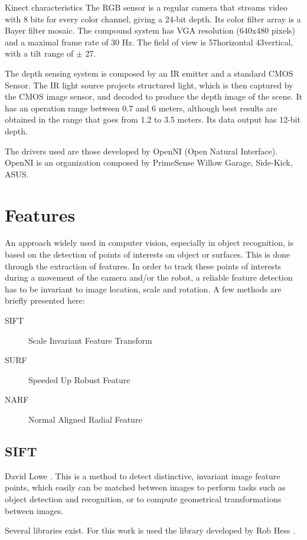 \documentclass[a4paper,11pt]{kth-mag}
\begin{document}
Kinect characteristics
The RGB sensor is a regular camera that streams video with 8 bits for every color channel, giving a 24-bit depth. Its color filter array is a Bayer filter mosaic. The compound system has VGA resolution (640x480 pixels) and a maximal frame rate of 30 Hz. The field of view is 57\textdegree horizontal 43\textdegree vertical, with a tilt range of $\pm$ 27\textdegree.

The depth sensing system is composed by an IR emitter and a standard CMOS Sensor. The IR light source projects structured light, which is then captured by the CMOS image sensor, and decoded to produce the depth image of the scene. It has an operation range between 0.7 and 6 meters, although best results are obtained in the range that goes from 1.2 to 3.5 meters. Its data output has 12-bit depth.

The drivers used are those developed by OpenNI (Open Natural Interface). OpenNI is an organization composed by PrimeSense Willow Garage, Side-Kick, ASUS.


\section{Features}

An approach widely used in computer vision, especially in object recognition, is based on the detection of points of interests on object or surfaces. This is done through the extraction of features. In order to track these points of interests during a movement of the camera and/or the robot, a reliable feature detection has to be invariant to image location, scale and rotation. A few methods are briefly presented here:
\begin{description}
\item[SIFT] Scale Invariant Feature Transform
\item[SURF] Speeded Up Robust Feature
\item[NARF] Normal Aligned Radial Feature
\end{description}

\subsection{SIFT}
David Lowe \cite{lowesift}.
This is a method to detect distinctive, invariant image feature points, which easily can be matched between images to perform tasks such as object detection and recognition, or to compute geometrical transformations between images.

Several libraries exist. For this work is used the library developed by Rob Hess \cite{hesssift}.
\end{document}

